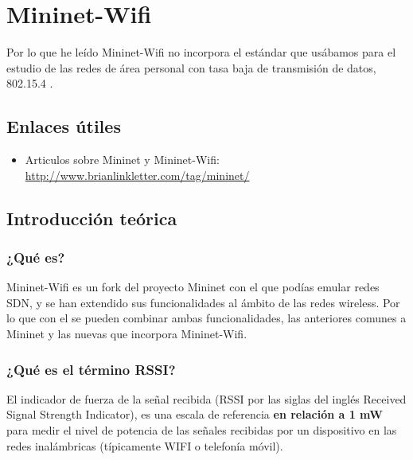 \chapter{Mininet-Wifi}

Por lo que he leído Mininet-Wifi no incorpora el estándar que usábamos para el estudio de las redes de área personal con tasa baja de transmisión de datos, 802.15.4 .
\section{Enlaces útiles}
\begin{itemize}
    \item Articulos sobre Mininet y Mininet-Wifi: \url{http://www.brianlinkletter.com/tag/mininet/}
    
\end{itemize}

\section{Introducción teórica}

\subsection{¿Qué es?}


Mininet-Wifi es un fork del proyecto Mininet con el que podías emular redes SDN, y se han extendido sus funcionalidades al ámbito de las redes wireless. Por lo que con el se pueden combinar ambas funcionalidades, las anteriores comunes a Mininet y las nuevas que incorpora Mininet-Wifi.

\subsection{¿Qué es el término RSSI?}

El indicador de fuerza de la señal recibida (RSSI por las siglas del inglés Received Signal Strength Indicator), es una escala de referencia \textbf{en relación a 1 mW} para medir el nivel de potencia de las señales recibidas por un dispositivo en las redes inalámbricas (típicamente WIFI o telefonía móvil).




